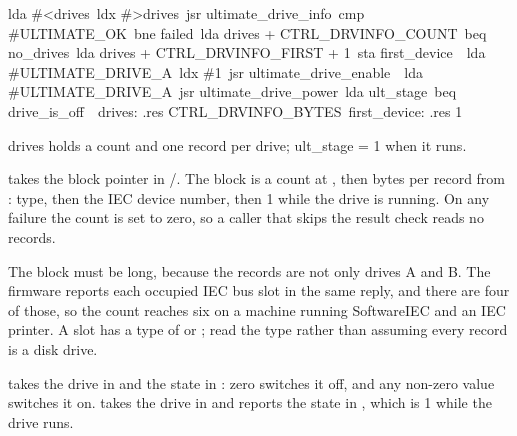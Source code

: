\begin{listingbox}
\hspace*{2em}lda \#<drives\
\hspace*{2em}ldx \#>drives\
\hspace*{2em}jsr ultimate\_drive\_info\
\hspace*{2em}cmp \#ULTIMATE\_OK\
\hspace*{2em}bne failed\
\hspace*{2em}lda drives + CTRL\_DRVINFO\_COUNT\
\hspace*{2em}beq no\_drives\
\hspace*{2em}lda drives + CTRL\_DRVINFO\_FIRST + 1\
\hspace*{2em}sta first\_device\
\
\hspace*{2em}lda \#ULTIMATE\_DRIVE\_A\
\hspace*{2em}ldx \#1\
\hspace*{2em}jsr ultimate\_drive\_enable\
\
\hspace*{2em}lda \#ULTIMATE\_DRIVE\_A\
\hspace*{2em}jsr ultimate\_drive\_power\
\hspace*{2em}lda ult\_stage\
\hspace*{2em}beq drive\_is\_off\
\
drives:       .res CTRL\_DRVINFO\_BYTES\
first\_device: .res 1
\end{listingbox}

\begin{resultbox}
drives holds a count and one record per drive; ult_stage = 1 when it runs.
\end{resultbox}

\cmd{ultimate\_drive\_info} takes the block pointer in /. The
block is a count at , then
 bytes per record from :
type, then the IEC device number, then 1 while the drive is running. On any
failure the count is set to zero, so a caller that skips the result check reads
no records.

The block must be  long, because the records are not
only drives A and B. The firmware reports each occupied IEC bus slot in the same
reply, and there are four of those, so the count reaches six on a machine
running SoftwareIEC and an IEC printer. A slot has a type of
 or ; read the type
rather than assuming every record is a disk drive.

 takes the drive in  and the state in
: zero switches it off, and any non-zero value switches it on.
 takes the drive in  and reports the state
in \cmd{ult\_stage}, which is 1 while the drive runs.

